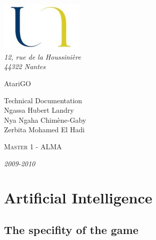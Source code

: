 \documentclass{report}
\begin{document}
\begin{titlepage}


\begin{flushleft}
\includegraphics*[width=4cm]{images/logo.jpg} \\
\textsl{12, rue de la Houssinière}\\
\textit{44322 Nantes}
\hrulefill
\end{flushleft}


\vspace{2cm}


\begin{flushleft}

{\fontsize{1.4cm}{1.65cm}\selectfont AtariGO } \\

\vspace{1cm}

{\Huge Technical Documentation}\\

\vspace{3cm}
{\Large Ngassa Hubert Landry}\\
{\Large Nya Ngaha Chimène-Gaby}\\
{\Large Zerbita Mohamed El Hadi} \\



\end{flushleft}

\vspace{2cm}

\begin{flushleft}
\textsc{Master 1 - ALMA}\\
\hrulefill
\end{flushleft}
\textit{2009-2010}

\end{titlepage}

\tableofcontents
\chapter {Artificial Intelligence}


\section {The specifity of the game}
\end{document}
